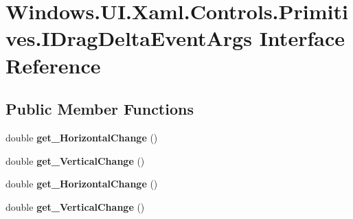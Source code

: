 \hypertarget{interface_windows_1_1_u_i_1_1_xaml_1_1_controls_1_1_primitives_1_1_i_drag_delta_event_args}{}\section{Windows.\+U\+I.\+Xaml.\+Controls.\+Primitives.\+I\+Drag\+Delta\+Event\+Args Interface Reference}
\label{interface_windows_1_1_u_i_1_1_xaml_1_1_controls_1_1_primitives_1_1_i_drag_delta_event_args}
\subsection*{Public Member Functions}
\begin{DoxyCompactItemize}
\item 
\mbox{\label{interface_windows_1_1_u_i_1_1_xaml_1_1_controls_1_1_primitives_1_1_i_drag_delta_event_args_a9e4c99f8e8e4aa64d6a6c0ce91eb070a}} 
double {\bfseries get\+\_\+\+Horizontal\+Change} ()
\item 
\mbox{\label{interface_windows_1_1_u_i_1_1_xaml_1_1_controls_1_1_primitives_1_1_i_drag_delta_event_args_a1bbac76823f97556984152912a0e5e7c}} 
double {\bfseries get\+\_\+\+Vertical\+Change} ()
\item 
\mbox{\label{interface_windows_1_1_u_i_1_1_xaml_1_1_controls_1_1_primitives_1_1_i_drag_delta_event_args_a9e4c99f8e8e4aa64d6a6c0ce91eb070a}} 
double {\bfseries get\+\_\+\+Horizontal\+Change} ()
\item 
\mbox{\label{interface_windows_1_1_u_i_1_1_xaml_1_1_controls_1_1_primitives_1_1_i_drag_delta_event_args_a1bbac76823f97556984152912a0e5e7c}} 
double {\bfseries get\+\_\+\+Vertical\+Change} ()
\item 
\mbox{\label{interface_windows_1_1_u_i_1_1_xaml_1_1_controls_1_1_primitives_1_1_i_drag_delta_event_args_a9e4c99f8e8e4aa64d6a6c0ce91eb070a}} 

\end{DoxyCompactItemize}
